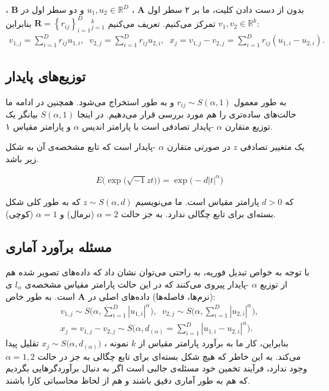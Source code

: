 بدون از دست دادن کلیت، ما بر ۲ سطر اول 
$\mathbf{A}$
، 
$u_1, u_2 \in \mathbb{R}^D$
و دو سطر اول در 
$\mathbf{B}$
،
$v_1, v_2 \in \mathbb{R}^k$
تمرکز می‌کنیم. تعریف می‌کنیم
$ \mathbf{R} = \left \{ r_{ij} \right \}_{i=1}^D {}_{j=1}^{k}$
بنابراین:
\begin{align}
v_{1,j} = \sum_{i=1}^{D} r_{ij}u_{1,i},\;\;
v_{2,j} = \sum_{i=1}^{D} r_{ij}u_{2,i},\;\;
x_j = v_{1,j} - v_{2,j} = \sum_{i=1}^D r_{ij}(u_{1,i} - u_{2,i}).
\label{eq:1hm}
\end{align}

\subsection{
توزیع‌های پایدار
}

به طور معمول 
$r_{ij} \sim S(\alpha, 1)$
 و به طور 
استخراج می‌شود. همچنین در ادامه ما حالت‌های ساده‌تری را هم مورد بررسی قرار می‌دهیم. در اینجا 
$S(\alpha, 1)$
بیانگر یک توزیع متقارن 
$\alpha$
-پایدار تصادفی است
\cite{litez171}
با پارامتر اندیس 
$\alpha$
و پارامتر مقیاس ۱.

یک متغییر تصادفی 
$z$
در صورتی متقارن  
$\alpha$
-پایدار است که تابع مشخصه‌ی آن به شکل زیر باشد.

\begin{align}
E \big( \exp  \big( \sqrt{-1}zt \big)  \big) = \exp \big( -d |t|^\alpha \big)
\label{eq:1hn}
\end{align}

که 
$d>0$
پارامتر مقیاس است. ما می‌نویسیم 
$z \sim S(\alpha, d)$
که به طور کلی شکل بسته‌ای برای تابع چگالی ندارد. به جز حالت 
$\alpha = 2$
(نرمال) و 
$\alpha = 1$
(کوچی).


\subsection{
مسئله برآورد آماری
}

با توجه به خواص تبدیل فوریه، به راحتی می‌توان نشان داد که داده‌های تصویر شده هم از توزیع 
$\alpha$
-پایدار پیروی می‌کنند که در این حالت پارامتر مقیاس مشخصه‌ی 
$l_\alpha$
ی (نرم‌ها، فاصله‌ها) داده‌های اصلی در 
$\mathbf{A}$
است. به طور خاص:
\begin{align}
v_{1,j} \sim S \bigg( \alpha, \sum_{i=1}^D |u_{1,i}|^\alpha \bigg), \;\;
v_{2,j} \sim S \bigg( \alpha, \sum_{i=1}^D |u_{2,i}|^\alpha \bigg),
 \label{eq:1hp}\\
x_j = v_{1,j} - v_{2,j} \sim S \bigg( \alpha, d_{(\alpha)} = 
\sum_{i=1}^D | u_{1,i} - u_{2,i} |^\alpha \bigg).
 \label{eq:1hq}
\end{align}
بنابراین، کار ما به برآورد پارامتر مقیاس از 
$k$
نمونه 
، 
$x_j \sim S \big( \alpha, d_{(\alpha)} \big)$
تقلیل پیدا می‌کند. به این خاطر که هیچ شکل بسته‌ای برای تابع چگالی به جز در حالت 
$\alpha = 1,2$
وجود ندارد، فرآیند تخمین خود مسئله‌ی جالبی است اگر به دنبال برآوردگرهایی بگردیم که هم به طور آماری دقیق باشند و هم از لحاظ محاسباتی کارا باشند.

